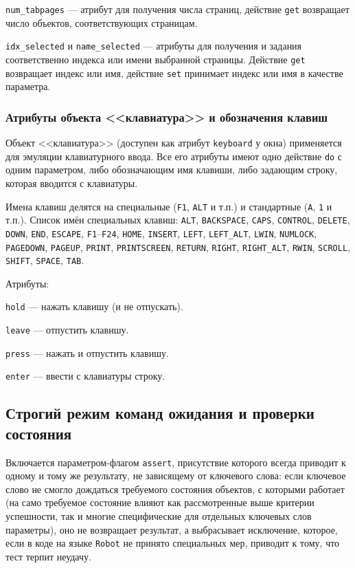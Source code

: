 \documentclass[11pt]{book} %
\begin{document}
\verb|num_tabpages| --- атрибут для получения числа страниц, действие \verb|get| возвращает число объектов, соответствующих страницам.

\verb|idx_selected| и \verb|name_selected| --- атрибуты для получения и задания соответственно индекса или имени выбранной страницы. Действие \verb|get| возвращает индекс или имя, действие \verb|set| принимает индекс или имя в качестве параметра.


\subsubsection{Атрибуты объекта <<клавиатура>> и обозначения клавиш}

Объект <<клавиатура>> (доступен как атрибут \verb|keyboard| у окна) применяется для эмуляции клавиатурного ввода. Все его атрибуты имеют одно действие \verb|do| с одним параметром, либо обозначающим имя клавиши, либо задающим строку, которая вводится с клавиатуры.

Имена клавиш делятся на специальные (\verb|F1|, \verb|ALT| и т.п.) и стандартные (\verb|A|, \verb|1| и т.п.). Список имён специальных клавиш: \verb'ALT', \verb'BACKSPACE', \verb'CAPS', \verb'CONTROL', \verb'DELETE', \verb'DOWN', \verb'END', \verb'ESCAPE', \verb'F1'--\verb'F24', \verb'HOME', \verb'INSERT', \verb'LEFT', \verb'LEFT_ALT', \verb'LWIN', \verb'NUMLOCK', \verb'PAGEDOWN', \verb'PAGEUP', \verb'PRINT', \verb'PRINTSCREEN', \verb'RETURN', \verb'RIGHT', \verb'RIGHT_ALT', \verb'RWIN', \verb'SCROLL', \verb'SHIFT', \verb'SPACE', \verb'TAB'.


Атрибуты:

\verb|hold| --- нажать клавишу (и не отпускать).

\verb|leave| --- отпустить клавишу.

\verb|press| --- нажать и отпустить клавишу.

\verb|enter| --- ввести с клавиатуры строку.

\subsection{Строгий режим команд ожидания и проверки состояния}

Включается параметром-флагом \verb|assert|, присутствие которого всегда приводит к одному и тому же результату, не зависящему от ключевого слова: если ключевое слово не смогло дождаться требуемого состояния объектов, с которыми работает (на само требуемое состояние влияют как рассмотренные выше критерии успешности, так и многие специфические для отдельных ключевых слов параметры), оно не возвращает результат, а выбрасывает исключение, которое, если в коде на языке \verb|Robot| не принято специальных мер, приводит к тому, что тест терпит неудачу.
\end{document}
